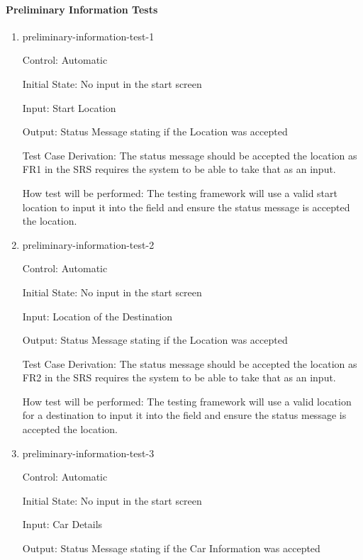 \documentclass[12pt, titlepage]{article}
\begin{document}
\paragraph{Preliminary Information Tests}

\begin{enumerate}

\item{preliminary-information-test-1\\}

Control: Automatic
					
Initial State: No input in the start screen
					
Input: Start Location
					
Output: Status Message stating if the Location was accepted

Test Case Derivation: The status message should be accepted the location as FR1 in the SRS 
requires the system to be able to take that as an input.
					
How test will be performed: The testing framework will use a valid start location to input 
it into the field and ensure the status message is accepted the location.
					
\item{preliminary-information-test-2\\}

Control: Automatic
					
Initial State: No input in the start screen
					
Input: Location of the Destination
					
Output: Status Message stating if the Location was accepted

Test Case Derivation: The status message should be accepted the location as FR2 in the SRS 
requires the system to be able to take that as an input.
					
How test will be performed: The testing framework will use a valid location for a destination to input 
it into the field and ensure the status message is accepted the location.

\item{preliminary-information-test-3\\}

Control: Automatic
					
Initial State: No input in the start screen
					
Input: Car Details
					
Output: Status Message stating if the Car Information was accepted


\end{enumerate}
\end{document}
